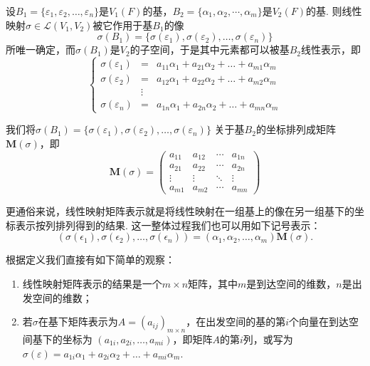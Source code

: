 \begin{definition}\label{def:7:线性映射矩阵表示}
    设$B_1=\{\varepsilon_1,\varepsilon_2,\ldots,\varepsilon_n\}$是$V_1(F)$的基，$B_2=\{\alpha_1,\alpha_2,\cdots,\alpha_m\}$是$V_2(F)$的基.
    则线性映射$\sigma \in \mathcal{L}(V_1,V_2)$被它作用于基$B_1$的像
    \[\sigma(B_1)=\{\sigma(\varepsilon_1),\sigma(\varepsilon_2),\ldots,\sigma(\varepsilon_n)\}\]
    所唯一确定，而$\sigma(B_1)$是$V_2$的子空间，于是其中元素都可以被基$B_2$线性表示，即
    \[ \left\{
     \begin{array}{rcl}
        \sigma(\varepsilon_1)&=&a_{11}\alpha_1+a_{21}\alpha_2+\ldots+a_{m1}\alpha_m \\
        \sigma(\varepsilon_2)&=&a_{12}\alpha_1+a_{22}\alpha_2+\ldots+a_{m2}\alpha_m \\
        &\vdots& \\
        \sigma(\varepsilon_n)&=&a_{1n}\alpha_1+a_{2n}\alpha_2+\ldots+a_{mn}\alpha_m
     \end{array}
    \right. \]

    我们将$\sigma(B_1)=\{\sigma(\varepsilon_1),\sigma(\varepsilon_2),\ldots,\sigma(\varepsilon_n)\}$
    关于基$B_2$的坐标排列成矩阵$\mathbf{M}(\sigma)$，即
    \[\mathbf{M}(\sigma)=\begin{pmatrix}
        a_{11} & a_{12} & \cdots & a_{1n} \\
        a_{21} & a_{22} & \cdots & a_{2n} \\
        \vdots & \vdots & \ddots & \vdots \\
        a_{m1} & a_{m2} & \cdots & a_{mn}
    \end{pmatrix}\]
\end{definition}
更通俗来说，线性映射矩阵表示就是将线性映射在一组基上的像在另一组基下的坐标表示按列排列得到的结果.
这一整体过程我们也可以用如下记号表示：
\begin{equation}\label{eq:7:线性映射矩阵表示}
    (\sigma(\epsilon_1),\sigma(\epsilon_2),\ldots,\sigma(\epsilon_n))=(\alpha_1,\alpha_2,\ldots,\alpha_m)\mathbf{M}(\sigma).
\end{equation}

根据定义我们直接有如下简单的观察：
\begin{enumerate}
    \item 线性映射矩阵表示的结果是一个$m\times n$矩阵，其中$m$是到达空间的维数，$n$是出发空间的维数；
    \item 若$\sigma$在基下矩阵表示为$A=(a_{ij})_{m\times n}$，在出发空间的基的第$i$个向量在到达空间基下的坐标为
    $(a_{1i},a_{2i},\ldots,a_{mi})$，即矩阵$A$的第$i$列，或写为$\sigma(\varepsilon)=a_{1i}\alpha_1+a_{2i}\alpha_2+\ldots+a_{mi}\alpha_m$.
\end{enumerate}

